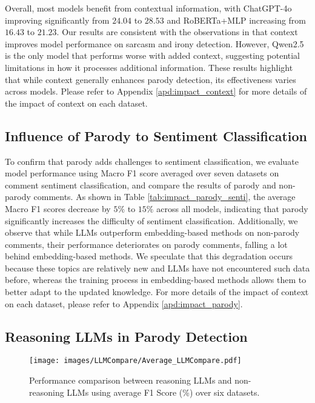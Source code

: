 Overall, most models benefit from contextual information, with ChatGPT-4o improving significantly from $24.04$ to $28.53$ and RoBERTa+MLP increasing from $16.43$ to $21.23$. Our results are consistent with the observations in \citep{dialogue_bamman,dialogue_wang} that context improves model performance on sarcasm and irony detection. However, Qwen2.5 is the only model that performs worse with added context, suggesting potential limitations in how it processes additional information. These results highlight that while context generally enhances parody detection, its effectiveness varies across models. Please refer to Appendix \ref{apd:impact_context} for more details of the impact of context on each dataset.

\subsection{Influence of Parody to Sentiment Classification}\label{sec:exp_parody_senti}


To confirm that parody adds challenges to sentiment classification, we evaluate model performance using Macro F1 score averaged over seven datasets on comment sentiment classification, and compare the results of parody and non-parody comments. As shown in Table \ref{tab:impact_parody_senti}, the average Macro F1 scores decrease by $5\%$ to $15\%$ across all models, indicating that parody significantly increases the difficulty of sentiment classification. Additionally, we observe that while LLMs outperform embedding-based methods on non-parody comments, their performance deteriorates on parody comments, falling a lot behind embedding-based methods. We speculate that this degradation occurs because these topics are relatively new and LLMs have not encountered such data before, whereas the training process in embedding-based methods allows them to better adapt to the updated knowledge. For more details of the impact of context on each dataset, please refer to Appendix \ref{apd:impact_parody}.

\subsection{Reasoning LLMs in Parody Detection}
\label{sec:exp_reasoning_llms}

\begin{figure}[t]
  \centering
  \texttt{[image: images/LLMCompare/Average\_LLMCompare.pdf]}
  \vspace{-0.4cm}
  \caption{Performance comparison between reasoning LLMs and non-reasoning LLMs using average F1 Score (\%) over six datasets.}\vspace{-0.4cm}
  \label{fig:reasoning_llms}
\end{figure}

